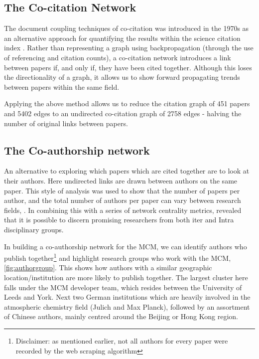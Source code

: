 \subsection{The Co-citation Network}\label{sec:cocitep}

The document coupling techniques of co-citation was introduced in the 1970s as an alternative approach for quantifying the results within the science citation index \citep{cocite}. Rather than representing a graph using backpropagation (through the use of referencing and citation counts), a co-citation network introduces a link between papers if, and only if, they have been cited together. Although this loses the directionality of a graph, it allows us to show forward propagating trends between papers within the same field. 

Applying the above method allows us to reduce the citation graph of 451 papers and 5402 edges to an undirected co-citation graph of 2758 edges - halving the number of original links between papers. 

\subsection{The Co-authorship network}
An alternative to exploring which papers which are cited together are to look at their authors. Here undirected links are drawn between authors on the same paper. This style of analysis was used to show that the number of papers per author, and the total number of authors per paper can vary between research fields, \citep{newmancoauthor}. In combining this with a series of network centrality metrics, \citep{coauthornew} revealed that it is possible to discern promising researchers from both iter and Intra disciplinary groups. 

In building a co-authorship network for the MCM, we can identify authors who publish together\footnote{ Disclaimer: as mentioned earlier, not all authors for every paper were recorded by the web scraping algorithm} and highlight research groups who work with the MCM, \autoref{fig:authorgroup}. This shows how authors with a similar geographic location/institution are more likely to publish together. The largest cluster here falls under the MCM developer team, which resides between the University of Leeds and York. Next two German institutions which are heavily involved in the atmospheric chemistry field (Julich and Max Planck), followed by an assortment of Chinese authors, mainly centred around the Beijing or Hong Kong region. 


